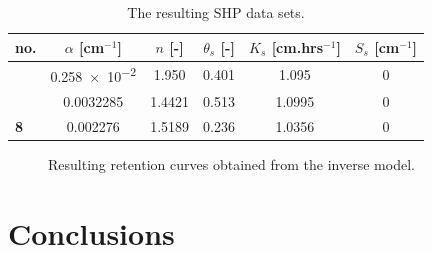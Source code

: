 \documentclass[review,times,3p,twocolumn,10pt]{elsarticle}
\newcommand{\fs}{\footnotesize}
\begin{document}
\begin{table}[ht]
\centering
\caption{The resulting SHP data sets.}
\fs
\begin{tabular}{l || c c c c c }
\toprule
no. & $\alpha$ [cm$^{-1}$] & $n$ [-] & $\theta_s$ [-] & $K_s$ [cm.hrs$^{-1}$] & $S_s$  [cm$^{-1}$]\\ \hline \hline
\rowcolor{white}{\bf 6} & \num{0.258e-2} & \num{1.950}  & 0.401 &  \num{1.095} & 0  \\ 
\rowcolor{white}{\bf 7} & \num{0.0032285} & \num{1.4421} & 0.513 &  \num{1.0995} & 0  \\ 
\rowcolor{white} {\bf 8} & \num{0.002276} & \num{1.5189} & 0.236 &  \num{1.0356} &  \num{0}\\ \hline
\toprule
\end{tabular}
\label{shp-vysledky-final}
\end{table}

\begin{figure}
\centering
{}
\caption{Resulting retention curves obtained from the inverse model.}
\label{retc-final}
\end{figure}

\section{Conclusions}
\end{document}
